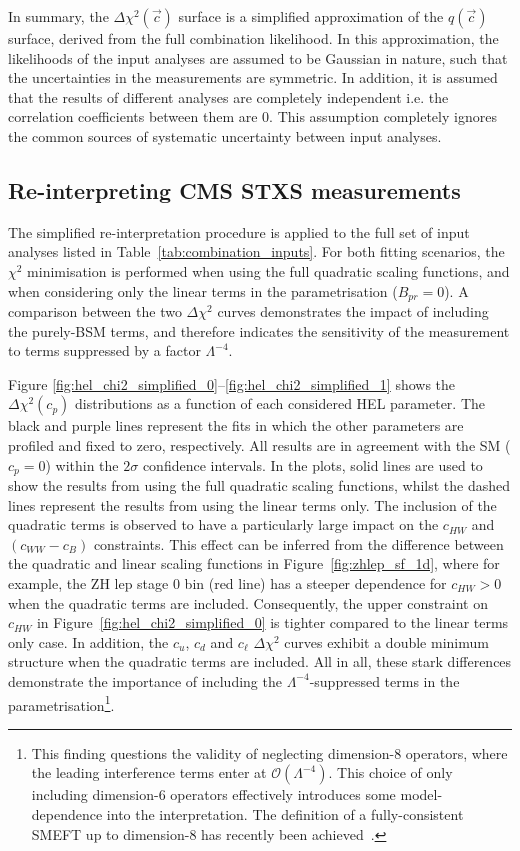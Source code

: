 In summary, the $\Delta\chi^2(\vec{c})$ surface is a simplified approximation of the $q(\vec{c})$ surface, derived from the full combination likelihood. In this approximation, the likelihoods of the input analyses are assumed to be Gaussian in nature, such that the uncertainties in the measurements are symmetric. In addition, it is assumed that the results of different analyses are completely independent i.e. the correlation coefficients between them are 0. This assumption completely ignores the common sources of systematic uncertainty between input analyses.

\subsection{Re-interpreting CMS STXS measurements}\label{sec:hel_simplified_cms}
The simplified re-interpretation procedure is applied to the full set of input analyses listed in Table~\ref{tab:combination_inputs}. For both fitting scenarios, the $\chi^2$ minimisation is performed when using the full quadratic scaling functions, and when considering only the linear terms in the parametrisation ($B_{pr}=0$). A comparison between the two $\Delta\chi^2$ curves demonstrates the impact of including the purely-BSM terms, and therefore indicates the sensitivity of the measurement to terms suppressed by a factor $\Lambda^{-4}$. 

Figure \ref{fig:hel_chi2_simplified_0}--\ref{fig:hel_chi2_simplified_1} shows the $\Delta\chi^2(c_p)$ distributions as a function of each considered HEL parameter. The black and purple lines represent the fits in which the other parameters are profiled and fixed to zero, respectively. All results are in agreement with the SM ($c_p=0$) within the $2\sigma$ confidence intervals. In the plots, solid lines are used to show the results from using the full quadratic scaling functions, whilst the dashed lines represent the results from using the linear terms only. The inclusion of the quadratic terms is observed to have a particularly large impact on the $c_{HW}$ and $(c_{WW}-c_B)$ constraints. This effect can be inferred from the difference between the quadratic and linear scaling functions in Figure~\ref{fig:zhlep_sf_1d}, where for example, the ZH lep stage 0 bin (red line) has a steeper dependence for $c_{HW}>0$ when the quadratic terms are included. Consequently, the upper constraint on $c_{HW}$ in Figure~\ref{fig:hel_chi2_simplified_0} is tighter compared to the linear terms only case. In addition, the $c_u$, $c_d$ and $c_{\ell}$ $\Delta\chi^2$ curves exhibit a double minimum structure when the quadratic terms are included. All in all, these stark differences demonstrate the importance of including the $\Lambda^{-4}$-suppressed terms in the parametrisation\footnote{This finding questions the validity of neglecting dimension-8 operators, where the leading interference terms enter at $\mathcal{O}(\Lambda^{-4})$. This choice of only including dimension-6 operators effectively introduces some model-dependence into the interpretation. The definition of a fully-consistent SMEFT up to dimension-8 has recently been achieved~\cite{Murphy:2020rsh}.}.

